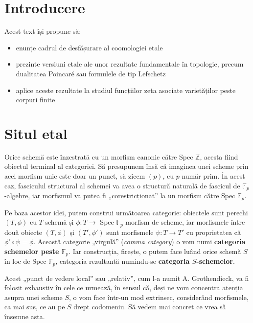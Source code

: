 \documentclass[13pt,openany]{book}
\begin{document}
\chapter{Introducere}

Acest text își propune să:

\begin{itemize}
\item enunțe cadrul de desfășurare al coomologiei etale
\item prezinte versiuni etale ale unor rezultate fundamentale în topologie, precum dualitatea Poincaré sau formulele de tip Lefschetz
\item aplice aceste rezultate la studiul funcțiilor zeta asociate varietăților peste corpuri finite
\end{itemize}

\cite{milne}\cite{lovering}\cite{dugger}

\newpage
\phantom{X}
\newpage

\pagestyle{headings}
\setcounter{secnumdepth}{2}

\chapter{Situl etal}
\setcounter{page}{1}

Orice schemă este înzestrată cu un morfism canonic către Spec $\mathbb{Z}$, acesta fiind obiectul terminal al categoriei. Să presupunem însă că imaginea unei scheme prin acel morfism unic este doar un punct, să zicem $(p)$, cu $p$ număr prim. În acest caz, fasciculul structural al schemei va avea o structură naturală de fascicul de $\mathbb{F}_p$-algebre, iar morfismul va putea fi „corestricționat” la un morfism către Spec $\mathbb{F}_p$.

Pe baza acestor idei, putem construi următoarea categorie: obiectele sunt perechi $(T,\phi)$ cu $T$ schemă și $\phi: T \rightarrow$ Spec $\mathbb{F}_p$ morfism de scheme, iar morfismele între două obiecte $(T,\phi)$ și $(T',\phi')$ sunt morfismele $\psi: T \rightarrow T'$ cu proprietatea că $\phi'\circ\psi=\phi$. Această categorie „virgulă” ({\it comma category}) o vom numi {\bf categoria schemelor peste $\mathbb{F}_p$}. Iar construcția, firește, o putem face luând orice schemă $S$ în loc de Spec $\mathbb{F}_p$, categoria rezultantă numindu-se {\bf categoria $S$-schemelor}.

Acest „punct de vedere local” sau „relativ”, cum l-a numit A. Grothendieck, va fi folosit exhaustiv în cele ce urmează, în sensul că, deși ne vom concentra atenția asupra unei scheme $S$, o vom face într-un mod extrinsec, considerând morfismele, ca mai sus, ce au pe $S$ drept codomeniu. Să vedem mai concret ce vrea să însemne asta.
\end{document}
